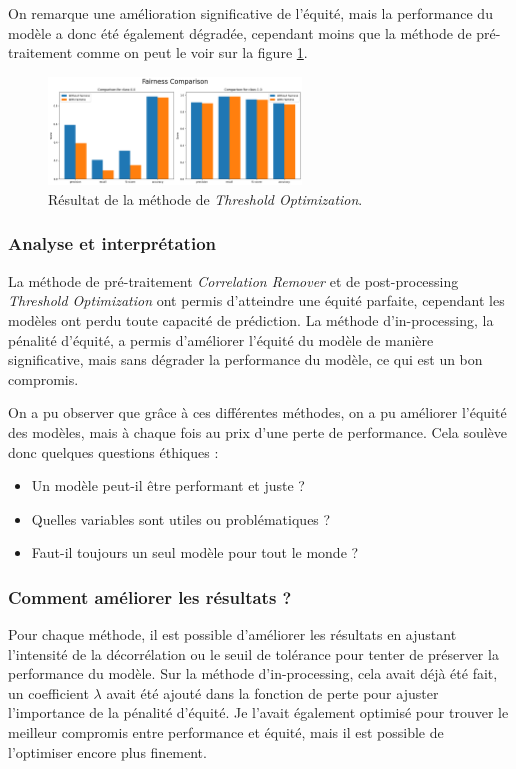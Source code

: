 \documentclass[12pt, letterpaper]{article}
\begin{document}
On remarque une amélioration significative de l'équité, mais la performance du modèle a donc été également dégradée, cependant 
moins que la méthode de pré-traitement comme on peut le voir sur la figure \ref{fig:threshold_opti_results}.

\begin{figure}
    \centering
    \includegraphics[width=0.6\textwidth]{threshold_opti_results}
    \caption{Résultat de la méthode de \emph{Threshold Optimization}.}
    \label{fig:threshold_opti_results}
\end{figure}

\subsubsection{Analyse et interprétation}
La méthode de pré-traitement \emph{Correlation Remover} et de post-processing \emph{Threshold Optimization} ont permis d'atteindre une équité parfaite, cependant les modèles ont perdu toute capacité de prédiction.
La méthode d'in-processing, la pénalité d'équité, a permis d'améliorer l'équité du modèle de manière significative, mais sans dégrader la performance du modèle, ce qui est un bon compromis.

On a pu observer que grâce à ces différentes méthodes, on a pu améliorer l'équité des modèles, mais à chaque fois au prix d'une perte de performance.
Cela soulève donc quelques questions éthiques :
\begin{itemize}
    \item Un modèle peut-il être performant et juste ?
    \item Quelles variables sont utiles ou problématiques ?
    \item Faut-il toujours un seul modèle pour tout le monde ?
\end{itemize}

\subsubsection*{Comment améliorer les résultats ?}
Pour chaque méthode, il est possible d'améliorer les résultats en ajustant l'intensité de la décorrélation ou le seuil de tolérance pour tenter de préserver la performance du modèle.
Sur la méthode d'in-processing, cela avait déjà été fait, un coefficient $\lambda$ avait été ajouté dans la fonction de perte pour ajuster l'importance de la pénalité d'équité.
Je l'avait également optimisé pour trouver le meilleur compromis entre performance et équité, mais il est possible de l'optimiser encore plus finement.
\end{document}
